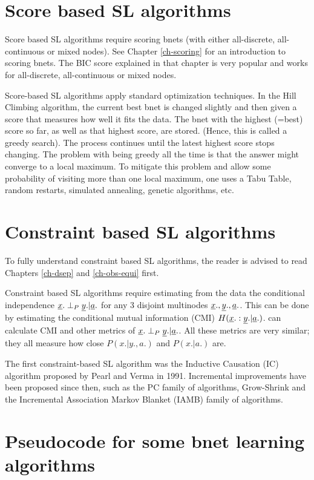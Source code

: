 \section{Score based SL algorithms}

Score based SL algorithms
require
scoring bnets (with either
all-discrete, all-continuous
or mixed nodes).
See Chapter \ref{ch-scoring}
for an introduction
to scoring bnets.
The BIC score
explained
in that chapter is
very popular
and works for all-discrete,
all-continuous or mixed nodes.

Score-based SL algorithms apply
standard
optimization techniques. 
In the Hill Climbing algorithm,
the current best
bnet is changed
slightly
and then given a score
that measures how well
it fits the data.
The bnet with the highest (=best) 
score so far, as well as that highest score,
are stored. (Hence,
this is called a greedy search).
The process continues
until the latest highest score stops changing.
The problem with being
greedy all the time is that
the answer might
converge to a local maximum.
To mitigate
this problem
and allow some
probability of visiting more
than one
local maximum, one uses a
Tabu Table, random restarts,
simulated annealing, genetic algorithms,
etc.

\section{Constraint based SL algorithms}

To fully understand
 constraint based SL 
algorithms,
the reader 
is advised to read Chapters 
\ref{ch-dsep} and \ref{ch-obs-equi}
first.

Constraint based SL algorithms
require
estimating from the data
the conditional independence
$\rvx.\perp_P \rvy.|\rva.$ 
for any 3 disjoint
multinodes $\rvx., \rvy., \rva.$.
This can be done by
estimating the conditional
mutual information (CMI)
$H(\rvx.:\rvy.|\rva.)$.
\bnlearn  can calculate CMI and
other metrics
of $\rvx.\perp_P \rvy.|\rva.$.
All these metrics are very
similar; they 
all measure
how close
$P(x.|y., a.)$
and $P(x.|a.)$ are.

The first
constraint-based SL algorithm
was the Inductive Causation (IC) algorithm
 proposed by Pearl and Verma in 1991.
Incremental
improvements
have been
proposed since then, such as
the PC family
of algorithms,
Grow-Shrink and
the
Incremental Association Markov Blanket (IAMB)
family of algorithms.

\newpage
\section{Pseudocode
for some bnet learning algorithms}






